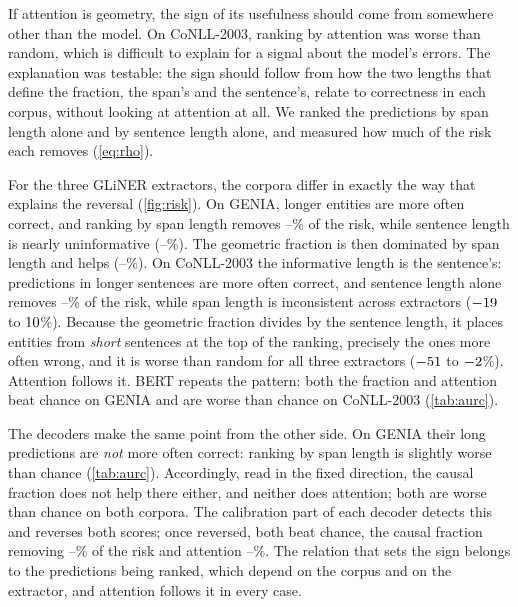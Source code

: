 \documentclass[11pt,a4paper]{article}
\newcommand{\gliner}{GLiNER}
\begin{document}
If attention is geometry, the sign of its usefulness should come from somewhere other than the model. On CoNLL-2003,
ranking by attention was worse than random, which is difficult to explain for a signal about the model's errors. The
explanation was testable: the sign should follow from how the two lengths that define the fraction, the span's and the
sentence's, relate to correctness in each corpus, without looking at attention at all. We ranked the predictions by span
length alone and by sentence length alone, and measured how much of the risk each removes (\cref{eq:rho}).

For the three \gliner{} extractors, the corpora differ in exactly the way that explains the reversal (\cref{fig:risk}). On
GENIA, longer entities are more often correct, and ranking by span length removes \rrSizeGeniaMin--\rrSizeGeniaMax\% of the
risk, while sentence length is nearly uninformative (\rrSentGeniaMin--\rrSentGeniaMax\%). The geometric fraction is then
dominated by span length and helps (\rrGeoGeniaMin--\rrGeoGeniaMax\%). On CoNLL-2003 the informative length is the
sentence's: predictions in longer sentences are more often correct, and sentence length alone removes
\rrSentConllMin--\rrSentConllMax\% of the risk, while span length is inconsistent across extractors ($-19$ to
$10$\%). Because the geometric fraction divides by the sentence length, it places entities from \emph{short}
sentences at the top of the ranking, precisely the ones more often wrong, and it is worse than random for all three
extractors ($-51$ to $-2$\%). Attention follows it. BERT repeats the pattern: both the fraction and
attention beat chance on GENIA and are worse than chance on CoNLL-2003 (\cref{tab:aurc}).

The decoders make the same point from the other side. On GENIA their long predictions are \emph{not} more often correct:
ranking by span length is slightly worse than chance (\cref{tab:aurc}). Accordingly, read in the fixed direction, the causal
fraction does not help there either, and neither does attention; both are worse than chance on both corpora. The calibration
part of each decoder detects this and reverses both scores; once reversed, both beat chance, the causal fraction removing
\rrDecGeoCalMin--\rrDecGeoCalMax\% of the risk and attention \rrDecMassCalMin--\rrDecMassCalMax\%. The relation that sets the
sign belongs to the predictions being ranked, which depend on the corpus and on the extractor, and attention follows it in
every case.
\end{document}
